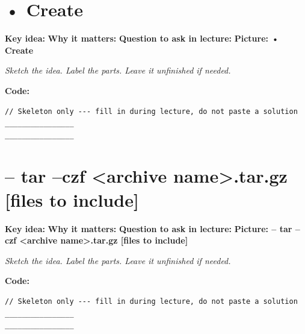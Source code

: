 \documentclass[12pt]{article}
\newcommand{\deflabel}[1]{\noindent\textcolor{slotdef}{\textbf{#1}}}
\newcommand{\drawlabel}[1]{\noindent\textcolor{slotdraw}{\textbf{#1}}}
\begin{document}
\section{• Create}
\Needspace{0.16\textheight}
\deflabel{Key idea:}
\vspace{1.1em}
\Needspace{0.16\textheight}
\deflabel{Why it matters:}
\vspace{1.1em}
\Needspace{0.16\textheight}
\deflabel{Question to ask in lecture:}
\vspace{1.1em}
\Needspace{0.28\textheight}
\drawlabel{Picture: • Create}
{\color{slotdraw}
\begin{framed}
\color{ink}
\begin{minipage}[t][0.22\textheight]{\textwidth}
\vspace{0.4em}
\textit{Sketch the idea. Label the parts. Leave it unfinished if needed.}
\end{minipage}
\end{framed}
}
\vspace{1em}
\Needspace{0.18\textheight}
\drawlabel{Code:}
\begin{lstlisting}
// Skeleton only --- fill in during lecture, do not paste a solution
________________
________________
\end{lstlisting}
\vspace{1em}
\section{– tar –czf <archive name>.tar.gz [files to include]}
\Needspace{0.16\textheight}
\deflabel{Key idea:}
\vspace{1.1em}
\Needspace{0.16\textheight}
\deflabel{Why it matters:}
\vspace{1.1em}
\Needspace{0.16\textheight}
\deflabel{Question to ask in lecture:}
\vspace{1.1em}
\Needspace{0.28\textheight}
\drawlabel{Picture: – tar –czf <archive name>.tar.gz [files to include]}
{\color{slotdraw}
\begin{framed}
\color{ink}
\begin{minipage}[t][0.22\textheight]{\textwidth}
\vspace{0.4em}
\textit{Sketch the idea. Label the parts. Leave it unfinished if needed.}
\end{minipage}
\end{framed}
}
\vspace{1em}
\Needspace{0.18\textheight}
\drawlabel{Code:}
\begin{lstlisting}
// Skeleton only --- fill in during lecture, do not paste a solution
________________
________________
\end{lstlisting}
\vspace{1em}
\end{document}
